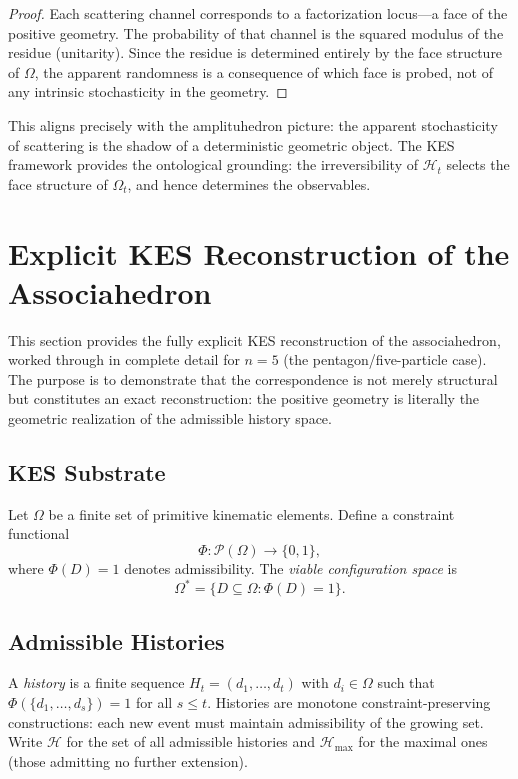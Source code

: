\documentclass[12pt, oneside]{amsart}
\theoremstyle{plain}
\theoremstyle{definition}
\theoremstyle{remark}
\newcommand{\Phif}{\Phi}   %
\newcommand{\OmKS}{\Omega}
\newcommand{\HKS}{\mathcal{H}}
\newcommand{\Hmax}{\mathcal{H}_{\max}}
\begin{document}
\begin{proof}
Each scattering channel corresponds to a factorization locus---a face of the positive geometry. The probability of that channel is the squared modulus of the residue (unitarity). Since the residue is determined entirely by the face structure of $\OmKS$, the apparent randomness is a consequence of which face is probed, not of any intrinsic stochasticity in the geometry.
\end{proof}

This aligns precisely with the amplituhedron picture: the apparent stochasticity of scattering is the shadow of a deterministic geometric object. The KES framework provides the ontological grounding: the irreversibility of $\HKS_t$ selects the face structure of $\OmKS_t$, and hence determines the observables.

\section{Explicit KES Reconstruction of the Associahedron}
\label{sec:discrete}

This section provides the fully explicit KES reconstruction of the associahedron, worked through in complete detail for $n = 5$ (the pentagon/five-particle case). The purpose is to demonstrate that the correspondence is not merely structural but constitutes an exact reconstruction: the positive geometry is literally the geometric realization of the admissible history space.

\subsection{KES Substrate}

Let $\OmKS$ be a finite set of primitive kinematic elements. Define a constraint functional
\[
  \Phif: \mathcal{P}(\OmKS) \to \{0,1\},
\]
where $\Phif(D) = 1$ denotes admissibility. The \emph{viable configuration space} is
\[
  \OmKS^* = \{D \subseteq \OmKS : \Phif(D) = 1\}.
\]

\subsection{Admissible Histories}

A \emph{history} is a finite sequence $H_t = (d_1, \ldots, d_t)$ with $d_i \in \OmKS$ such that $\Phif(\{d_1, \ldots, d_s\}) = 1$ for all $s \leq t$. Histories are monotone constraint-preserving constructions: each new event must maintain admissibility of the growing set. Write $\mathcal{H}$ for the set of all admissible histories and $\Hmax$ for the maximal ones (those admitting no further extension).
\end{document}
